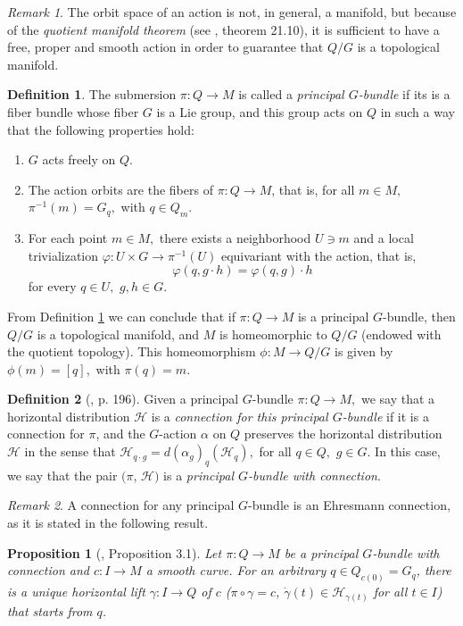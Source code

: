 \documentclass[12pt, letterpaper, reqno]{amsart}
\theoremstyle{definition}
\newtheorem{df}{Definition}
\theoremstyle{plain}
\newtheorem{prop}{Proposition}
\theoremstyle{remark}
\newtheorem{rem}{Remark}
\begin{document}
\begin{rem}
The orbit space of an action is not, in general, a manifold, but because of the \textit{quotient manifold theorem} (see \cite{lee2003introduction}, theorem 21.10), it is sufficient to have a free, proper and smooth action in order to guarantee that $ Q/G $ is a topological manifold.
\end{rem}
\begin{df}\label{df:principalGbundle}
	The submersion $ \pi: Q \rightarrow M$  is called a \textit{principal $ G $-bundle} if its is a fiber bundle whose fiber $ G $ is a Lie group, and this group acts on $ Q $ in such a way that the following properties hold:
	\begin{enumerate}
		\item $ G $ acts freely on $ Q $.
		\item The action orbits are the fibers of $ \pi:Q \rightarrow {M} $, that is, for all $ m\in M, $ $ \pi^{-1}(m) = G_q, $ with $ q\in Q_m. $ 
		\item For each point $ m\in M, $ there exists a neighborhood $ U\ni m $ and a local trivialization $ \varphi: U\times G \rightarrow \pi^{-1}(U)$ equivariant with the action, that is,
			$$ \varphi(q, g\cdot h)=\varphi(q,g)\cdot h  $$ 
			for every $ q\in U, $ $ g,h\in G. $ 
	\end{enumerate}
\end{df}

From Definition \ref{df:principalGbundle} we can conclude that if $ \pi: Q \rightarrow M $ is a principal $ G $-bundle, then $Q/G  $ is a topological manifold, and $M $ is homeomorphic to $ Q/G $ (endowed with the quotient topology). This homeomorphism $ \phi: M \rightarrow {Q/G}$  is given by $ \phi(m)=[q], $ with $ \pi(q)=m. $ 

\begin{df}[\cite{montgomery2002tour}, p. 196]
	Given a principal $ G $-bundle $ \pi: Q \rightarrow M, $ we say that a horizontal distribution $ \mathcal{H} $ is a \textit{connection for this principal $ G $-bundle} if it is a connection for $ \pi $, and the $ G $-action $ \alpha $  on $ Q $ preserves the horizontal distribution $ \mathcal{H} $ in the sense that $ \mathcal{H}_{q\cdot g} = d(\alpha_g)_q (\mathcal{H}_q), $ for all $ q\in Q, $ $ g\in G $. In this case, we say that the pair $ (\pi$, $ \mathcal{H}) $ is a \textit{principal $ G $-bundle with connection}. 

\end{df}

\begin{rem}
A connection for any principal $ G $-bundle is an Ehresmann connection, as it is stated in the following result. 
\end{rem}
\begin{prop}[\cite{kobayashi1963foundations}, Proposition 3.1]\label{prop:comp_bundle}
	Let $ \pi: Q \rightarrow M $ be a principal $ G $-bundle with connection and $ c: I \rightarrow M $ a smooth curve. For an arbitrary $ q\in Q_{c(0)}= G_q $, there is a unique horizontal lift $ \gamma: I \rightarrow Q $ of $ c $ ($\pi\circ\gamma =c$, $ \dot{\gamma}(t)\in \mathcal{H}_{\gamma(t)} $ for all $ t\in I $) that starts from $ q $.    	
\end{prop}
\end{document}
